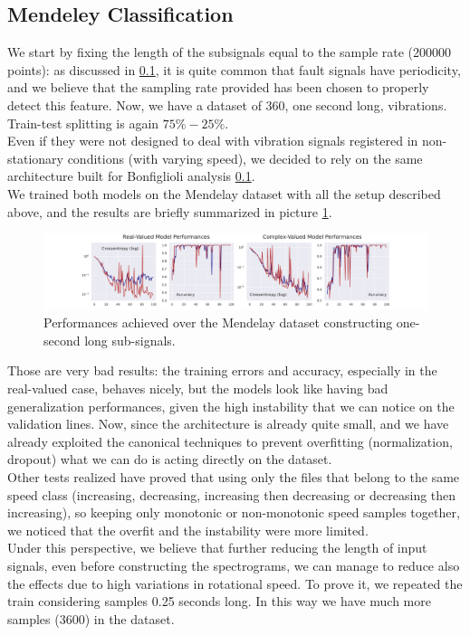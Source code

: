 \documentclass[../main.tex]{subfiles}
\begin{document}
\subsection{Mendeley Classification}

We start by fixing the length of the subsignals equal to the sample rate (200000 points): as discussed in \ref{}, it is quite common that fault signals have periodicity, and we believe that the sampling rate provided has been chosen to properly detect this feature. Now, we have a dataset of 360, one second long, vibrations. Train-test splitting is again $75\%-25\%$.\\
Even if they were not designed to deal with vibration signals registered in non-stationary conditions (with varying speed), we decided to rely on the same architecture built for Bonfiglioli analysis \ref{}.\\
We trained both models on the Mendelay dataset with all the setup described above, and the results are briefly summarized in picture \ref{fig:mendeley_train_bad}.	
\begin{figure}[!ht]
	\centering
	\includegraphics[width=\textwidth]{pictures/mendeley_train_bad}
	\caption{Performances achieved over the Mendelay dataset constructing one-second long sub-signals.}
	\label{fig:mendeley_train_bad}
\end{figure}
Those are very bad results: the training errors and accuracy, especially in the real-valued case, behaves nicely, but the models look like having bad generalization performances, given the high instability that we can notice on the validation lines. Now, since the architecture is already quite small, and we have already exploited the canonical techniques to prevent overfitting (normalization, dropout) what we can do is acting directly on the dataset.\\
Other tests realized have proved that using only the files that belong to the same speed class (increasing, decreasing, increasing then decreasing or decreasing then increasing), so keeping only monotonic or non-monotonic speed samples together, we noticed that the overfit and the instability were more limited.\\
Under this perspective, we believe that further reducing the length of input signals, even before constructing the spectrograms, we can manage to reduce also the effects due to high variations in rotational speed. To prove it, we repeated the train considering samples 0.25 seconds long. In this way we have much more samples (3600) in the dataset.
\end{document}
